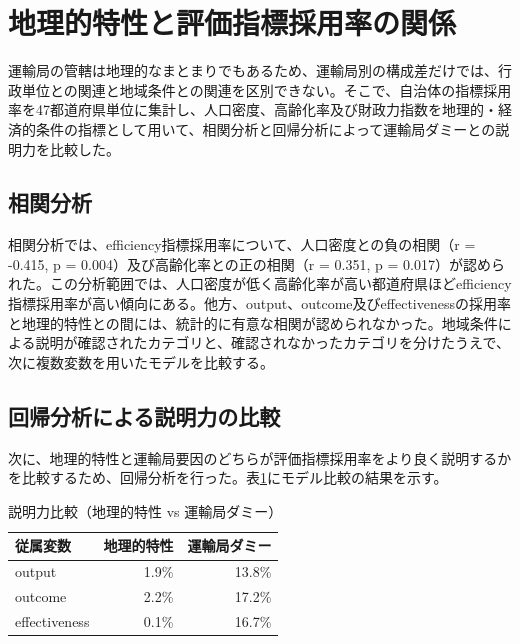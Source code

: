 \section{地理的特性と評価指標採用率の関係}
\label{sec:ch6_geo}

運輸局の管轄は地理的なまとまりでもあるため、運輸局別の構成差だけでは、行政単位との関連と地域条件との関連を区別できない。そこで、自治体の指標採用率を47都道府県単位に集計し、人口密度、高齢化率及び財政力指数を地理的・経済的条件の指標として用いて、相関分析と回帰分析によって運輸局ダミーとの説明力を比較した。

\subsection{相関分析}

相関分析では、efficiency指標採用率について、人口密度との負の相関（r = -0.415, p = 0.004）及び高齢化率との正の相関（r = 0.351, p = 0.017）が認められた。この分析範囲では、人口密度が低く高齢化率が高い都道府県ほどefficiency指標採用率が高い傾向にある。他方、output、outcome及びeffectivenessの採用率と地理的特性との間には、統計的に有意な相関が認められなかった。地域条件による説明が確認されたカテゴリと、確認されなかったカテゴリを分けたうえで、次に複数変数を用いたモデルを比較する。

\subsection{回帰分析による説明力の比較}

次に、地理的特性と運輸局要因のどちらが評価指標採用率をより良く説明するかを比較するため、回帰分析を行った。表\ref{tab:r2_comparison}にモデル比較の結果を示す。

\begin{table}[htbp]
\caption{説明力比較（地理的特性 vs 運輸局ダミー）}
\label{tab:r2_comparison}
\centering
\begin{tabular}{lrr}
\toprule
従属変数 & 地理的特性 & 運輸局ダミー \\
\midrule
output & 1.9\% & 13.8\% \\
outcome & 2.2\% & 17.2\% \\
effectiveness & 0.1\% & 16.7\% \\
\bottomrule
\end{tabular}
\end{table}

